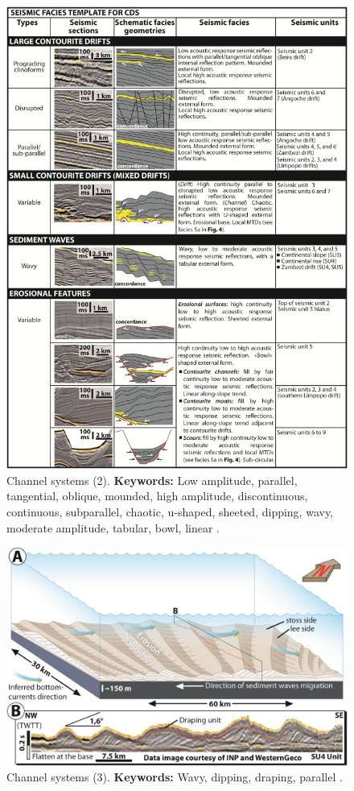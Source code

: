 \begin{figure}[h!]
    \centering
    \includegraphics[width=0.9\linewidth]{Figures/0.3Seismic/Thieblemont2020-2.jpg}
    \caption[Channel systems (2)]{Channel systems (2). \textbf{Keywords: }Low amplitude, parallel, tangential, oblique, mounded, high amplitude, discontinuous, continuous, subparallel, chaotic, u-shaped, sheeted, dipping, wavy, moderate amplitude, tabular, bowl, linear \citep{Thieblemont2020}.}
    \label{fig:Thieblemont2020-2}
\end{figure}
\clearpage

\begin{figure}[h!]
    \centering
    \includegraphics[width=0.75\linewidth]{Figures/0.3Seismic/Thieblemont2020-3.jpg}
    \caption[Channel systems (3).]{Channel systems (3). \textbf{Keywords: } Wavy, dipping, draping, parallel \citep{Thieblemont2020}.}
    \label{fig:Thieblemont2020-3}
\end{figure}

